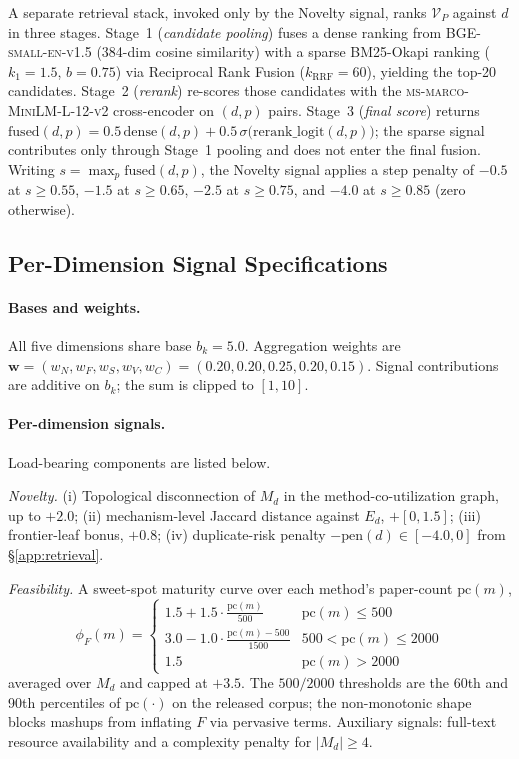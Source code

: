 \documentclass{opendatalab}
\begin{document}
A separate retrieval stack, invoked only by the Novelty signal, ranks $\mathcal{V}_P$ against $d$ in three stages.
Stage~1 (\emph{candidate pooling}) fuses a dense ranking from \textsc{BGE-small-en-v1.5} (384-dim cosine
similarity) with a sparse BM25-Okapi ranking ($k_1=1.5$, $b=0.75$) via Reciprocal Rank Fusion
($k_{\text{RRF}}=60$), yielding the top-20 candidates. Stage~2 (\emph{rerank}) re-scores those candidates with the
\textsc{ms-marco-MiniLM-L-12-v2} cross-encoder on $(d, p)$ pairs. Stage~3 (\emph{final score}) returns
$\mathrm{fused}(d,p)=0.5\,\mathrm{dense}(d,p)+0.5\,\sigma\!\big(\mathrm{rerank\_logit}(d,p)\big)$; the sparse
signal contributes only through Stage~1 pooling and does not enter the final fusion. Writing
$s=\max_p\mathrm{fused}(d,p)$, the Novelty signal applies a step penalty of $-0.5$ at $s\!\ge\!0.55$, $-1.5$ at
$s\!\ge\!0.65$, $-2.5$ at $s\!\ge\!0.75$, and $-4.0$ at $s\!\ge\!0.85$ (zero otherwise).


\subsection{Per-Dimension Signal Specifications}
\label{app:eval-signals}

\paragraph{Bases and weights.}
All five dimensions share base $b_k=5.0$. Aggregation weights are
$\mathbf{w}=(w_N,w_F,w_S,w_V,w_C)=(0.20,0.20,0.25,0.20,0.15)$. Signal contributions are additive on $b_k$; the sum
is clipped to $[1,10]$.

\paragraph{Per-dimension signals.}
Load-bearing components are listed below.

\emph{Novelty.} (i) Topological disconnection of $M_d$ in the method-co-utilization graph, up to $+2.0$;
(ii) mechanism-level Jaccard distance against $E_d$, $+[0,1.5]$; (iii) frontier-leaf bonus, $+0.8$;
(iv) duplicate-risk penalty $-\mathrm{pen}(d)\in[-4.0,0]$ from \S\ref{app:retrieval}.

\emph{Feasibility.} A sweet-spot maturity curve over each method's paper-count $\mathrm{pc}(m)$,
\begin{equation*}
\phi_F(m)=
\begin{cases}
1.5+1.5\cdot\tfrac{\mathrm{pc}(m)}{500} & \mathrm{pc}(m)\le500 \\
3.0-1.0\cdot\tfrac{\mathrm{pc}(m)-500}{1500} & 500<\mathrm{pc}(m)\le 2000 \\
1.5 & \mathrm{pc}(m)>2000
\end{cases}
\end{equation*}
averaged over $M_d$ and capped at $+3.5$. The $500/2000$ thresholds are the 60th and 90th percentiles of
$\mathrm{pc}(\cdot)$ on the released corpus; the non-monotonic shape blocks mashups from inflating $F$ via
pervasive terms. Auxiliary signals: full-text resource availability and a complexity penalty for $|M_d|\ge 4$.
\end{document}
